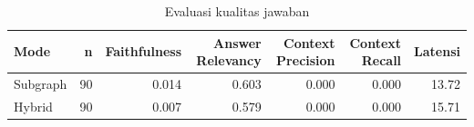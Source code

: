 \begin{table}[htbp]
    \centering
    \small
    \caption{Evaluasi kualitas jawaban}
    \label{tab:bab4-answer-quality}
    \begin{tabular}{lrrrrrr}
        \toprule
        Mode & n & Faithfulness & Answer Relevancy & Context Precision & Context Recall & Latensi \\
        \midrule
        Subgraph & 90 & 0.014 & 0.603 & 0.000 & 0.000 & 13.72 \\
        Hybrid & 90 & 0.007 & 0.579 & 0.000 & 0.000 & 15.71 \\
        \bottomrule
    \end{tabular}
\end{table}
